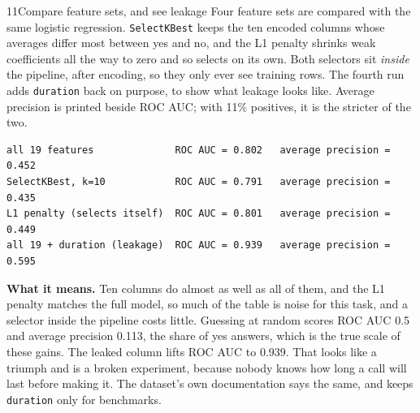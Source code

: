 \begin{labquestion}{11}{Compare feature sets, and see leakage}
Four feature sets are compared with the same logistic regression. \texttt{SelectKBest} keeps the ten encoded columns whose averages differ most between yes and no, and the L1 penalty shrinks weak coefficients all the way to zero and so selects on its own. Both selectors sit \emph{inside} the pipeline, after encoding, so they only ever see training rows. The fourth run adds \texttt{duration} back on purpose, to show what leakage looks like. Average precision is printed beside ROC AUC; with 11\% positives, it is the stricter of the two.
\end{labquestion}
\begin{labanswer}

\begin{refoutput}
\begin{lstlisting}[style=utpterminal]
all 19 features              ROC AUC = 0.802   average precision = 0.452
SelectKBest, k=10            ROC AUC = 0.791   average precision = 0.435
L1 penalty (selects itself)  ROC AUC = 0.801   average precision = 0.449
all 19 + duration (leakage)  ROC AUC = 0.939   average precision = 0.595
\end{lstlisting}
\end{refoutput}

\textbf{What it means.} Ten columns do almost as well as all of them, and the L1 penalty matches the full model, so much of the table is noise for this task, and a selector inside the pipeline costs little. Guessing at random scores ROC AUC 0.5 and average precision 0.113, the share of yes answers, which is the true scale of these gains. The leaked column lifts ROC AUC to 0.939. That looks like a triumph and is a broken experiment, because nobody knows how long a call will last before making it. The dataset's own documentation says the same, and keeps \texttt{duration} only for benchmarks.
\end{labanswer}

